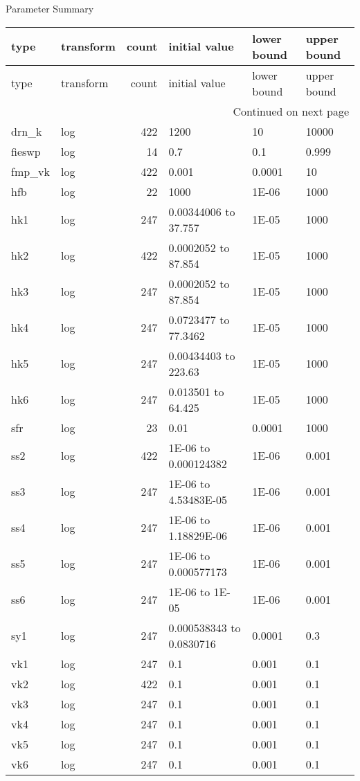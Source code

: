 \documentclass{article}
\begin{document}
\begin{center}
Parameter Summary
\end{center}
\begin{center}
\begin{landscape}
\begin{longtable}{llrlll}
type & transform & count & initial value & lower bound & upper bound \\
\endfirsthead
type & transform & count & initial value & lower bound & upper bound \\
\endhead
\multicolumn{6}{r}{Continued on next page} \\
\endfoot
\endlastfoot
drn_k & log & 422 &  1200 &    10 & 10000 \\
fieswp & log & 14 &   0.7 &   0.1 & 0.999 \\
fmp_vk & log & 422 & 0.001 & 0.0001 &    10 \\
hfb & log & 22 &  1000 & 1E-06 &  1000 \\
hk1 & log & 247 & 0.00344006 to 37.757 & 1E-05 &  1000 \\
hk2 & log & 422 & 0.0002052 to 87.854 & 1E-05 &  1000 \\
hk3 & log & 247 & 0.0002052 to 87.854 & 1E-05 &  1000 \\
hk4 & log & 247 & 0.0723477 to 77.3462 & 1E-05 &  1000 \\
hk5 & log & 247 & 0.00434403 to 223.63 & 1E-05 &  1000 \\
hk6 & log & 247 & 0.013501 to 64.425 & 1E-05 &  1000 \\
sfr & log & 23 &  0.01 & 0.0001 &  1000 \\
ss2 & log & 422 & 1E-06 to 0.000124382 & 1E-06 & 0.001 \\
ss3 & log & 247 & 1E-06 to 4.53483E-05 & 1E-06 & 0.001 \\
ss4 & log & 247 & 1E-06 to 1.18829E-06 & 1E-06 & 0.001 \\
ss5 & log & 247 & 1E-06 to 0.000577173 & 1E-06 & 0.001 \\
ss6 & log & 247 & 1E-06 to 1E-05 & 1E-06 & 0.001 \\
sy1 & log & 247 & 0.000538343 to 0.0830716 & 0.0001 &   0.3 \\
vk1 & log & 247 &   0.1 & 0.001 &   0.1 \\
vk2 & log & 422 &   0.1 & 0.001 &   0.1 \\
vk3 & log & 247 &   0.1 & 0.001 &   0.1 \\
vk4 & log & 247 &   0.1 & 0.001 &   0.1 \\
vk5 & log & 247 &   0.1 & 0.001 &   0.1 \\
vk6 & log & 247 &   0.1 & 0.001 &   0.1 \\
\end{longtable}
\end{landscape}
\end{center}
\end{document}
